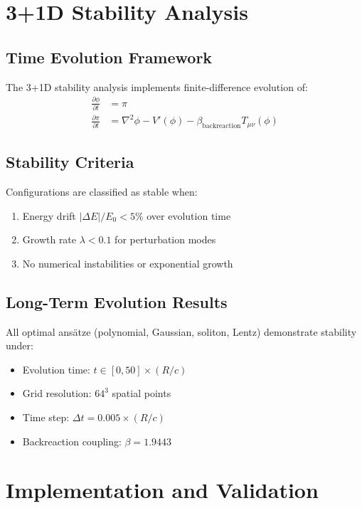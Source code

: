 \documentclass[11pt,a4paper]{article}
\begin{document}
\begin{table}[h]
\begin{table}[h]
\section{3+1D Stability Analysis}

\subsection{Time Evolution Framework}

The 3+1D stability analysis implements finite-difference evolution of:
\begin{align}
\frac{\partial\phi}{\partial t} &= \pi \\
\frac{\partial\pi}{\partial t} &= \nabla^2\phi - V'(\phi) - \beta_{\text{backreaction}} T_{\mu\nu}(\phi)
\end{align}

\subsection{Stability Criteria}

Configurations are classified as stable when:
\begin{enumerate}
\item Energy drift $|\Delta E|/E_0 < 5\%$ over evolution time
\item Growth rate $\lambda < 0.1$ for perturbation modes  
\item No numerical instabilities or exponential growth
\end{enumerate}

\subsection{Long-Term Evolution Results}

All optimal ansätze (polynomial, Gaussian, soliton, Lentz) demonstrate stability under:
\begin{itemize}
\item Evolution time: $t \in [0, 50] \times (R/c)$
\item Grid resolution: $64^3$ spatial points
\item Time step: $\Delta t = 0.005 \times (R/c)$
\item Backreaction coupling: $\beta = 1.9443$
\end{itemize}

\section{Implementation and Validation}


\end{table}
\end{table}
\end{document}
